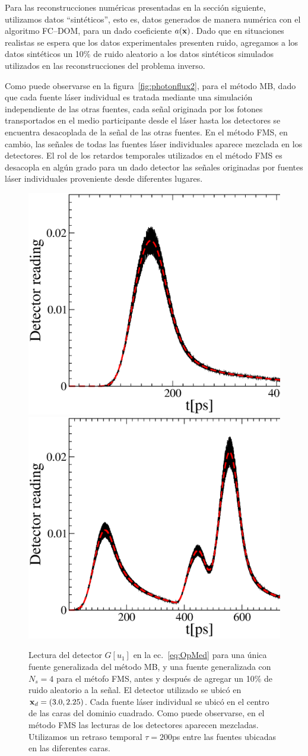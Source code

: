 Para las reconstrucciones numéricas presentadas en la sección siguiente, utilizamos 
datos ``sintéticos'', esto es, datos generados de manera numérica 
con el algoritmo FC--DOM, para un dado 
coeficiente $a(\mathbf{x})$. Dado que en situaciones realistas se espera 
que los datos experimentales presenten ruido, agregamos a los 
datos sintéticos un 10\% de ruido aleatorio a los datos sintéticos simulados 
utilizados en las reconstrucciones del problema inverso. 


Como puede observarse en la figura~\ref{fig:photonflux2}, para el método 
MB, dado que cada fuente láser individual es tratada mediante una simulación 
independiente de las otras fuentes, cada señal originada por los fotones 
transportados en el medio participante desde el láser hasta los detectores 
se encuentra desacoplada de la señal de las otras fuentes. En el método 
FMS, en cambio, las señales de todas las fuentes láser individuales 
aparece mezclada en los detectores.  El rol de los retardos temporales 
utilizados en el método FMS es desacopla en algún grado para 
un dado detector las señales 
originadas por fuentes láser individuales proveniente desde diferentes lugares.  

\begin{figure}[h!]
\centering
  \includegraphics[width=0.48\linewidth]{figuras/detread_sweep.eps}
  \includegraphics[width=0.48\linewidth]{figuras/detread_prop.eps}
  \caption{Lectura del detector $G[u_1]$ en la ec.~\eqref{eq:OpMed} para 
  una única fuente generalizada del método MB, y una fuente generalizada con 
  $N_s=4$ para el métofo FMS, antes y después de agregar un 10\% de ruido aleatorio 
  a la señal. El detector utilizado se ubicó en  $\mathbf{x}_d=(3.0,2.25)$. Cada fuente 
  láser individual se ubicó en el centro de las caras del dominio cuadrado. 
  Como puede observarse, en el método FMS las lecturas de los detectores 
  aparecen mezcladas. Utilizamos un retraso temporal  $\tau=200$ps entre las fuentes 
  ubicadas en las diferentes caras.}
 \label{fig:detread}
\end{figure}

